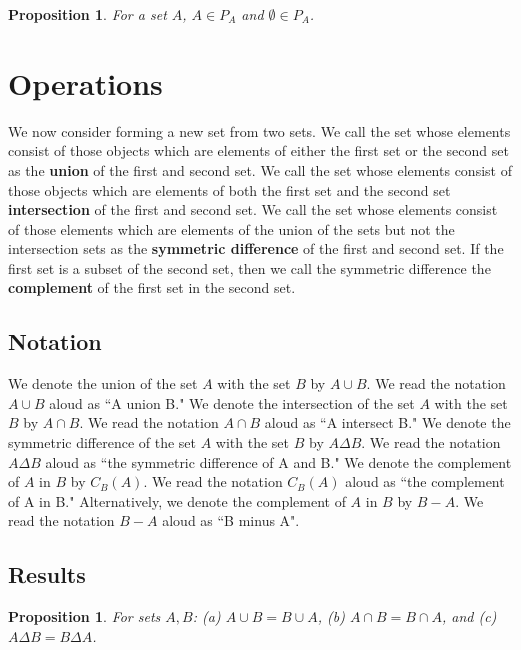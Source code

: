 \documentclass[18pt]{article}
\newcommand{\definition}[1]{\textbf{#1}}
\newcommand{\say}[1]{``#1"}
\newcommand{\union}{\cup}
\newcommand{\intersect}{\cap}
\newcommand{\symdif}{\Delta}
\newtheorem{prop}[thm]{Proposition}
\begin{document}
\begin{prop}
  For a set $A$, $A \in P_A$ and $\emptyset \in P_A$.
\end{prop}

\section{Operations}

We now consider forming a new set from two sets.
We call the set whose elements consist of those objects which are elements of either the first set or the second set as the \definition{union} of the first and second set.
We call the set whose elements consist of those objects which are elements of both the first set and the second set \definition{intersection} of the first and second set.
We call the set whose elements consist of those elements which are elements of the union of the sets but not the intersection sets as the \definition{symmetric difference} of the first and second set.
If the first set is a subset of the second set, then we call the symmetric difference the \definition{complement} of the first set in the second set.

\subsection{Notation}

We denote the union of the set $A$ with the set $B$ by $A \union B$.
We read the notation $A \union B$ aloud as \say{A union B.}
We denote the intersection of the set $A$ with the set $B$ by $A \intersect B$.
We read the notation $A \intersect B$ aloud as \say{A intersect B.}
We denote the symmetric difference of the set $A$ with the set $B$ by $A \symdif B$.
We read the notation $A \symdif B$ aloud as \say{the symmetric difference of A and B.}
We denote the complement of $A$ in $B$ by $C_B(A)$.
We read the notation $C_B(A)$ aloud as \say{the complement of A in B.}
Alternatively, we denote the complement of $A$ in $B$ by $B - A$.
We read the notation $B - A$ aloud as \say{B minus A}.

\subsection{Results}

\begin{prop}
  For sets $A, B$: (a) $A \union B = B \union A$, (b) $A \intersect B = B \intersect A$, and (c)  $A \symdif B = B \symdif A$.
\end{prop}
\end{document}
